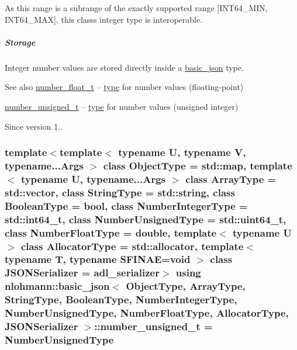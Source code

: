 As this range is a subrange of the exactly supported range \mbox{[}I\+N\+T64\+\_\+\+M\+IN, I\+N\+T64\+\_\+\+M\+AX\mbox{]}, this class\textquotesingle{}s integer type is interoperable.

\subparagraph*{Storage}

Integer number values are stored directly inside a \hyperlink{classnlohmann_1_1basic__json}{basic\+\_\+json} type.

\begin{DoxySeeAlso}{See also}
\hyperlink{classnlohmann_1_1basic__json_a88d6103cb3620410b35200ee8e313d97}{number\+\_\+float\+\_\+t} -- \hyperlink{classnlohmann_1_1basic__json_a2b2d781d7f2a4ee41bc0016e931cadf7}{type} for number values (floating-\/point)

\hyperlink{classnlohmann_1_1basic__json_ab906e29b5d83ac162e823ada2156b989}{number\+\_\+unsigned\+\_\+t} -- \hyperlink{classnlohmann_1_1basic__json_a2b2d781d7f2a4ee41bc0016e931cadf7}{type} for number values (unsigned integer)
\end{DoxySeeAlso}
\begin{DoxySince}{Since}
version 1.. 
\end{DoxySince}
\subsubsection[{\texorpdfstring{number\+\_\+unsigned\+\_\+t}{number_unsigned_t}}]{\setlength{\rightskip}{0pt plus 5cm}template$<$template$<$ typename U, typename V, typename...\+Args $>$ class Object\+Type = std\+::map, template$<$ typename U, typename...\+Args $>$ class Array\+Type = std\+::vector, class String\+Type  = std\+::string, class Boolean\+Type  = bool, class Number\+Integer\+Type  = std\+::int64\+\_\+t, class Number\+Unsigned\+Type  = std\+::uint64\+\_\+t, class Number\+Float\+Type  = double, template$<$ typename U $>$ class Allocator\+Type = std\+::allocator, template$<$ typename T, typename S\+F\+I\+N\+A\+E=void $>$ class J\+S\+O\+N\+Serializer = adl\+\_\+serializer$>$ using {\bf nlohmann\+::basic\+\_\+json}$<$ Object\+Type, Array\+Type, String\+Type, Boolean\+Type, Number\+Integer\+Type, Number\+Unsigned\+Type, Number\+Float\+Type, Allocator\+Type, J\+S\+O\+N\+Serializer $>$\+::{\bf number\+\_\+unsigned\+\_\+t} =  Number\+Unsigned\+Type}\hypertarget{classnlohmann_1_1basic__json_ab906e29b5d83ac162e823ada2156b989}{}\label{classnlohmann_1_1basic__json_ab906e29b5d83ac162e823ada2156b989}


